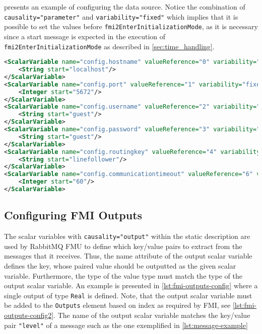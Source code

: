  presents an example of configuring the data
source. Notice the combination of \texttt{causality="parameter"} and
\texttt{variability="fixed"} which implies that it is possible to set the values
before \texttt{fmi2EnterInitiali\-za\-tion\-Mode}, as it is necessary since a start
message is expected in the execution of \texttt{fmi2EnterInitializationMode} as
described in \cref{sec:time_handling}.
\begin{lstlisting}[label={lst:data-source-config},caption={Data source connection
    configuration of RabbitMQ FMU},language=XML]
<ScalarVariable name="config.hostname" valueReference="0" variability="fixed" causality="parameter">
    <String start="localhost"/>
</ScalarVariable>
<ScalarVariable name="config.port" valueReference="1" variability="fixed" causality="parameter">
    <Integer start="5672"/>
</ScalarVariable>
<ScalarVariable name="config.username" valueReference="2" variability="fixed" causality="parameter">
    <String start="guest"/>
</ScalarVariable>
<ScalarVariable name="config.password" valueReference="3" variability="fixed" causality="parameter">
    <String start="guest"/>
</ScalarVariable>
<ScalarVariable name="config.routingkey" valueReference="4" variability="fixed" causality="parameter">
    <String start="linefollower"/>
</ScalarVariable>
<ScalarVariable name="config.communicationtimeout" valueReference="6" variability="fixed" causality="parameter" description="Network read time out in seconds">
    <Integer start="60"/>
</ScalarVariable>
  \end{lstlisting}


\subsection{Configuring  FMI Outputs}
The scalar variables with \texttt{causality="output"} within the static
description are used by RabbitMQ FMU to define which key/value pairs to extract
from the messages that it receives. Thus, the name attribute of the output
scalar variable defines the key, whose paired value should be outputted as the
given scalar variable. Furthermore, the type of the value type must match the type of the
output scalar variable. An example is presented in \cref{lst:fmi-outputs-config}
where a single output of type \texttt{Real} is defined. Note, that the output
scalar variable must be added to the \texttt{Outputs} element based on index as
required by FMI, see \cref{lst:fmi-outputs-config2}. The name of the output scalar variable matches the
key/value pair \texttt{"level"} of a message such as the one exemplified in \cref{lst:message-example}

